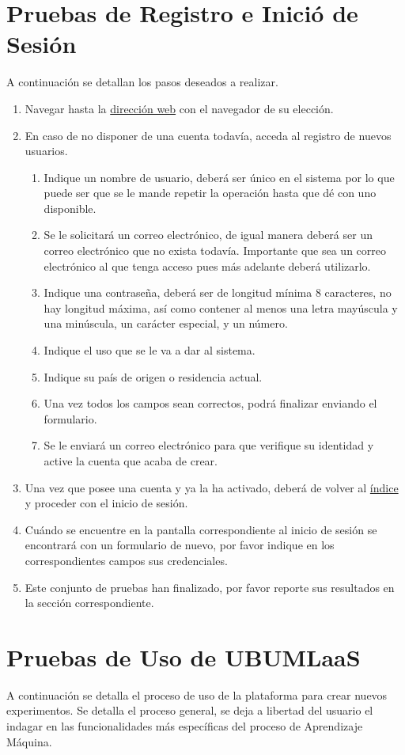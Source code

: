 \documentclass[
	12pt,
	spanish
]{article}
\newcommand{\direccion}{http://puenramihome.ddns.net:8081}
\begin{document}
\section{Pruebas de Registro e Inició de Sesión}
A continuación se detallan los pasos deseados a realizar.
\begin{enumerate}
\item Navegar hasta la \href{\direccion}{dirección web} con el navegador de su elección.
\item En caso de no disponer de una cuenta todavía, acceda al registro de nuevos usuarios.
\begin{enumerate}
\item Indique un nombre de usuario, deberá ser único en el sistema por lo que puede ser que se le mande repetir la operación hasta que dé con uno disponible.
\item Se le solicitará un correo electrónico, de igual manera deberá ser un correo electrónico que no exista todavía. Importante que sea un correo electrónico al que tenga acceso pues más adelante deberá utilizarlo.
\item Indique una contraseña, deberá ser de longitud mínima 8 caracteres, no hay longitud máxima, así como contener al menos una letra mayúscula y una minúscula, un carácter especial, y un número.
\item Indique el uso que se le va a dar al sistema.
\item Indique su país de origen o residencia actual.
\item Una vez todos los campos sean correctos, podrá finalizar enviando el formulario.
\item Se le enviará un correo electrónico para que verifique su identidad y active la cuenta que acaba de crear.
\end{enumerate}
\item Una vez que posee una cuenta y ya la ha activado, deberá de volver al \href{\direccion}{índice} y proceder con el inicio de sesión.
\item Cuándo se encuentre en la pantalla correspondiente al inicio de sesión se encontrará con un formulario de nuevo, por favor indique en los correspondientes campos sus credenciales.
\item Este conjunto de pruebas han finalizado, por favor reporte sus resultados en la sección correspondiente.
\end{enumerate}

\clearpage
\section{Pruebas de Uso de UBUMLaaS}
A continuación se detalla el proceso de uso de la plataforma para crear nuevos experimentos. Se detalla el proceso general, se deja a libertad del usuario el indagar en las funcionalidades más específicas del proceso de Aprendizaje Máquina.
\end{document}
